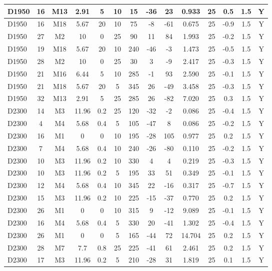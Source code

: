 \documentclass{article}
\begin{document}
\begin{center}
\begin{longtable}{|l|c|c|c|c|c|c|c|c|c|c|c|c|c|}
D1950	&	16	&	M13	&	2.91	&	5	&	10	&	15	&	-36	&	23	&	0.933	&	25	&	0.5	&	1.5	&	Y	\\\hline
D1950	&	16	&	M18	&	5.67	&	20	&	10	&	75	&	-8	&	-61	&	0.675	&	25	&	-0.9	&	1.5	&	Y	\\\hline
D1950	&	27	&	M2	&	10	&	0	&	25	&	90	&	11	&	84	&	1.993	&	25	&	-0.2	&	1.5	&	Y	\\\hline
D1950	&	19	&	M18	&	5.67	&	20	&	10	&	240	&	-46	&	-3	&	1.473	&	25	&	-0.5	&	1.5	&	Y	\\\hline
D1950	&	28	&	M2	&	10	&	0	&	25	&	30	&	3	&	-9	&	2.417	&	25	&	-0.3	&	1.5	&	Y	\\\hline
D1950	&	21	&	M16	&	6.44	&	5	&	10	&	285	&	-1	&	93	&	2.590	&	25	&	-0.1	&	1.5	&	Y	\\\hline
D1950	&	21	&	M18	&	5.67	&	20	&	5	&	345	&	26	&	-49	&	3.458	&	25	&	-0.3	&	1.5	&	Y	\\\hline
D1950	&	32	&	M13	&	2.91	&	5	&	25	&	285	&	26	&	-82	&	7.020	&	25	&	0.3	&	1.5	&	Y	\\\hline
D2300	&	14	&	M3	&	11.96	&	0.2	&	25	&	120	&	-32	&	-2	&	0.086	&	25	&	-0.4	&	1.5	&	Y	\\\hline
D2300	&	4	&	M4	&	5.68	&	0.4	&	5	&	105	&	-47	&	8	&	0.086	&	25	&	-0.2	&	1.5	&	Y	\\\hline
D2300	&	16	&	M1	&	0	&	0	&	10	&	195	&	-28	&	105	&	0.977	&	25	&	0.2	&	1.5	&	Y	\\\hline
D2300	&	7	&	M4	&	5.68	&	0.4	&	10	&	240	&	-26	&	-80	&	0.110	&	25	&	-0.2	&	1.5	&	Y	\\\hline
D2300	&	10	&	M3	&	11.96	&	0.2	&	10	&	330	&	4	&	4	&	0.219	&	25	&	-0.3	&	1.5	&	Y	\\\hline
D2300	&	10	&	M3	&	11.96	&	0.2	&	5	&	195	&	33	&	51	&	0.349	&	25	&	-0.1	&	1.5	&	Y	\\\hline
D2300	&	12	&	M4	&	5.68	&	0.4	&	10	&	345	&	22	&	-16	&	0.317	&	25	&	-0.7	&	1.5	&	Y	\\\hline
D2300	&	15	&	M3	&	11.96	&	0.2	&	10	&	225	&	-15	&	-37	&	0.770	&	25	&	0.2	&	1.5	&	Y	\\\hline
D2300	&	26	&	M1	&	0	&	0	&	10	&	315	&	9	&	-12	&	9.089	&	25	&	-0.1	&	1.5	&	Y	\\\hline
D2300	&	16	&	M4	&	5.68	&	0.4	&	5	&	330	&	20	&	-41	&	1.302	&	25	&	-0.4	&	1.5	&	Y	\\\hline
D2300	&	26	&	M1	&	0	&	0	&	5	&	165	&	-44	&	72	&	14.704	&	25	&	0.2	&	1.5	&	Y	\\\hline
D2300	&	28	&	M7	&	7.7	&	0.8	&	25	&	225	&	-41	&	61	&	2.461	&	25	&	0.2	&	1.5	&	Y	\\\hline
D2300	&	17	&	M3	&	11.96	&	0.2	&	5	&	210	&	-28	&	31	&	1.819	&	25	&	0.1	&	1.5	&	Y	\\\hline

\end{longtable}
\end{center}
\end{document}
